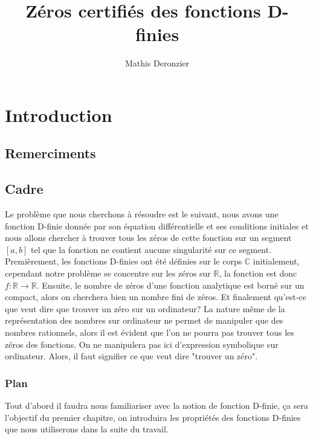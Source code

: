 \documentclass[a4paper,10.5pt]{article}
\title{Zéros certifiés des fonctions D-finies}
\author{Mathis Deronzier}
\date{}
\begin{document}
	
	\maketitle
	\renewcommand{\contentsname}{Sommaire}
	\newpage
	\tableofcontents
	\newpage
	
	\section{Introduction}
	\newtheorem{theorem}{Théorème}[section] 
	\newtheorem{proposition}{Proposition}
	\newtheorem{corollaire}{Corollaire}
	\newtheorem{definition}{Définition}
	\newtheorem{demonstration}{Démonstration}
	\subsection{Remerciments}
	\subsection{Cadre}
	
	Le problème que nous cherchons à résoudre est le suivant, nous avons une fonction D-finie donnée par son équation différentielle et ses conditions initiales et nous allons chercher à trouver tous les zéros de cette fonction sur un segment $[a,b]$ tel que la fonction ne contient aucune singularité sur ce segment. \\
	Premièrement, les fonctions D-finies ont été définies sur le corps $\mathbb{C}$ initialement, cependant notre problème se concentre sur les zéros sur $\mathbb{R}$, la fonction est donc $f: \mathbb{R} \rightarrow \mathbb{R}$.
	Ensuite, le nombre de zéros d'une fonction analytique est borné sur un compact, alors on cherchera bien un nombre fini de zéros.
	Et finalement qu'est-ce que veut dire que trouver un zéro sur un ordinateur? La nature même de la représentation des nombres sur ordinateur ne permet de manipuler que des nombres rationnels, alors il est évident que l'on ne pourra pas trouver tous les zéros des fonctions. On ne manipulera pas ici d'expression symbolique sur ordinateur. Alors, il faut signifier ce que veut dire "trouver un zéro".
	
	\subsubsection{Plan}
	
	Tout d'abord il faudra nous familiariser avec la notion de fonction D-finie, ça sera l'objectif du premier chapitre, on introduira les propriétés des fonctions D-finies que nous utiliserons dans la suite du travail.
	
\end{document}
